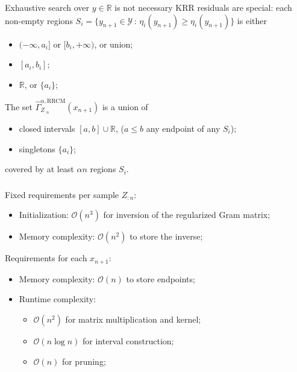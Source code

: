 \documentclass[t]{beamer}  %
\newcommand{\Ycal}{\mathcal{Y}}
\newcommand{\Ocal}{\mathcal{O}}
\newcommand{\Real}{\mathbb{R}}
\begin{document}
\begin{frame}[c]\frametitle{\insertsection}
  \framesubtitle{\insertsubsection}
  \begin{block}{Exhaustive search over $y\in \Real$ is not necessary}
    KRR residuals are special: each non-empty regions
    $S_i = \{y_{n+1}\in \Ycal \,:\, \eta_i(y_{n+1}) \geq \eta_i(y_{n+1})\}$
    is either \begin{itemize}
      \item $(-\infty, a_i]$ or $[b_i, +\infty)$, or union;
      \item $[a_i, b_i]$;
      \item $\Real$, or $\{a_i\}$;
    \end{itemize}
    \vspace{\baselineskip}
    The set $\hat{\Gamma}_{Z_{:n}}^{\alpha, \text{RRCM}}(x_{n+1})$ is a union of
    \begin{itemize}
      \item closed intervals $[a, b]\cup\Real$, ($a\leq b$ any endpoint of any $S_i$);
      \item singletons $\{a_i\}$;
    \end{itemize}
    covered by at least $\alpha n$ regions $S_i$.
  \end{block}
\end{frame}

\begin{frame}[c]\frametitle{\insertsection}
\framesubtitle{\insertsubsection}
  Fixed requirements per sample $Z_{:n}$: \begin{itemize}
    \item Initialization: $\Ocal(n^3)$ for inversion of the regularized Gram matrix;
    \item Memory complexity: $\Ocal(n^2)$ to store the inverse;
  \end{itemize}
  \vspace{\baselineskip}
  Requirements for each $x_{n+1}$:
  \begin{itemize}
    \item Memory complexity: $\Ocal(n)$ to store endpoints;
    \item Runtime complexity: \begin{itemize}
      \item $\Ocal(n^2)$ for matrix multiplication and kernel;
      \item $\Ocal(n \log n)$ for interval construction;
      \item $\Ocal(n)$ for pruning;
    \end{itemize}
  \end{itemize}
\end{frame}
\end{document}
